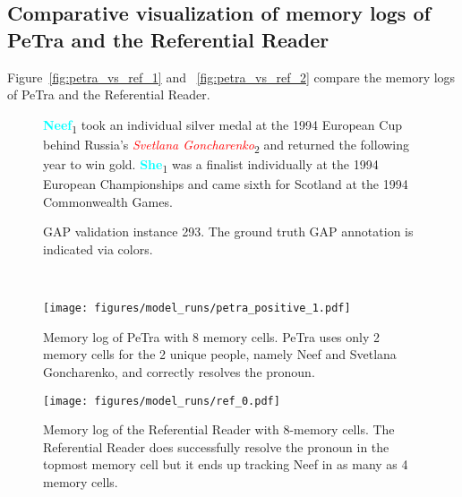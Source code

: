 \documentclass[11pt,a4paper]{article}
\newcommand{\modelname}{PeTra\xspace}
\newcommand{\hlent}[2]{\colorbox{gray!30}{#1\textsubscript{#2}}}
\begin{document}
\subsection{Comparative visualization of memory logs of \modelname and the Referential Reader}
\label{sec:app_visualizations}
Figure~\ref{fig:petra_vs_ref_1} and ~\ref{fig:petra_vs_ref_2} compare the memory logs of \modelname and the Referential Reader.

\begin{figure*}[h]
    \begin{subfigure}[t]{\textwidth}
    \begin{mdframed}
        \hlent{\textcolor{aqua}{\bf Neef}}{1} took an individual silver medal at the 1994 European Cup behind Russia's \hlent{\textcolor{red}{\it Svetlana Goncharenko}}{2} and returned the following year to win gold. \hlent{\textcolor{aqua}{\bf She}}{1} was a finalist individually at the 1994 European Championships and came sixth for Scotland at the 1994 Commonwealth Games.
    \end{mdframed}
    \caption{GAP validation instance 293. The ground truth GAP annotation is indicated via colors.}
    \end{subfigure}
    ~\vspace{0.2in}
    \centering
    \begin{subfigure}[t]{\textwidth}
    \texttt{[image: figures/model\_runs/petra\_positive\_1.pdf]}
    \caption{Memory log of \modelname with 8 memory cells. \modelname uses only 2 memory cells for the 2 unique people, namely Neef and Svetlana Goncharenko, and correctly resolves the pronoun.}
    \end{subfigure}
    \begin{subfigure}[t]{\textwidth}
    \texttt{[image: figures/model\_runs/ref\_0.pdf]}
    \caption{Memory log of the Referential Reader with 8-memory cells. The Referential Reader does successfully resolve the pronoun in the topmost memory cell but it ends up tracking Neef in as many as 4 memory cells.}
    \end{subfigure}
    \caption{
    Both the models only weakly detect ``Svetlana Goncharenko" which could be due to lack of span modeling.}
    \label{fig:petra_vs_ref_1}
\end{figure*}
\end{document}
